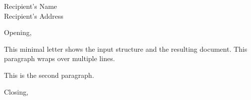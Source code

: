 \documentclass[a4paper]{letter}
\begin{document}
\begin{letter}{Recipient's Name\\ Recipient's Address}
	\address{Sender's Address}
	\signature{Sender's Name}

	\opening{Opening,}
	This minimal letter shows the input structure
	and the resulting document.
	This paragraph wraps over multiple lines.

	This is the second paragraph.
	\closing{Closing,}
\end{letter}
\end{document}
